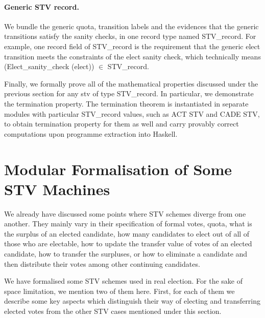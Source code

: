 \documentclass{llncs}
\begin{document}
\paragraph{Generic STV record.} We bundle the generic quota,  transition labels and the evidences that the generic transitions satisfy the sanity checks, in one record type named {\selectfont STV\_record}. For example, one record field of {\selectfont STV\_record} is the requirement that the generic elect transition meets the constraints of the elect sanity check, which technically means ({\selectfont Elect\_sanity\_check (elect)}) $\in$ {\selectfont STV\_record}. 


Finally, we formally prove all of the mathematical properties discussed under the previous section for any {\selectfont stv} of type {\selectfont STV\_record}. In particular, we demonstrate the termination property. The termination theorem is instantiated in separate modules with particular {\selectfont STV\_record} values, such as ACT STV and CADE STV, to obtain termination property for them as well and carry provably correct computations upon programme extraction into Haskell.
\section{Modular Formalisation of Some STV Machines}
We already have discussed some points where STV schemes diverge from one another. They mainly vary in their specification of formal votes, quota, what is the surplus of an elected candidate, how many candidates to elect out of all of those who are electable, how to update the transfer value of votes of an elected candidate, how to transfer the surpluses, or how to eliminate a candidate and then distribute their votes among other continuing candidates.


We have formalised some STV schemes used in real election. For the sake of space limitation, we mention two of them here. First, for each of them we describe some key aspects which distinguish their way of electing and transferring elected  votes from the other STV cases mentioned under this section.
  
\end{document}
